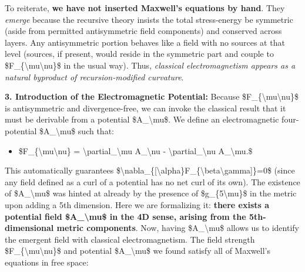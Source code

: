 \documentclass[
]{article}
\begin{document}
To reiterate, \textbf{we have not inserted Maxwell's equations by hand}.
They \emph{emerge} because the recursive theory insists the total
stress-energy be symmetric (aside from permitted antisymmetric field
components) and conserved across layers. Any antisymmetric portion
behaves like a field with no sources at that level (sources, if present,
would reside in the symmetric part and couple to
\$F\_\{\textbackslash mu\textbackslash nu\}\$ in the usual way). Thus,
\emph{classical electromagnetism appears as a natural byproduct of
recursion-modified curvature}\hspace{0pt}.

\textbf{3. Introduction of the Electromagnetic Potential:} Because
\$F\_\{\textbackslash mu\textbackslash nu\}\$ is antisymmetric and
divergence-free, we can invoke the classical result that it must be
derivable from a potential \$A\_\textbackslash mu\$. We define an
electromagnetic four-potential \$A\_\textbackslash mu\$ such that:

\begin{itemize}
\item
  \$F\_\{\textbackslash mu\textbackslash nu\} =
  \textbackslash partial\_\textbackslash mu A\_\textbackslash nu -
  \textbackslash partial\_\textbackslash nu A\_\textbackslash mu.\$
\end{itemize}

This automatically guarantees
\$\textbackslash nabla\_\{{[}\textbackslash alpha\}F\_\{\textbackslash beta\textbackslash gamma{]}\}=0\$
(since any field defined as a curl of a potential has no net curl of its
own). The existence of \$A\_\textbackslash mu\$ was hinted at already by
the presence of \$g\_\{5\textbackslash mu\}\$ in the metric upon adding
a 5th dimension. Here we are formalizing it: \textbf{there exists a
potential field \$A\_\textbackslash mu\$ in the 4D sense, arising from
the 5th-dimensional metric components}\hspace{0pt}. Now, having
\$A\_\textbackslash mu\$ allows us to identify the emergent field with
classical electromagnetism. The field strength
\$F\_\{\textbackslash mu\textbackslash nu\}\$ and potential
\$A\_\textbackslash mu\$ we found satisfy all of Maxwell's equations in
free space:
\end{document}
